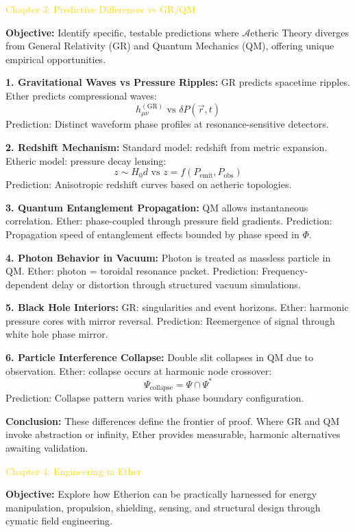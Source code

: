 \textcolor{gold}{ Chapter 3: Predictive Differences vs GR/QM }

\textbf{Objective:}
Identify specific, testable predictions where $\mathcal{A}$etheric Theory diverges from General Relativity (GR) and Quantum Mechanics (QM), offering unique empirical opportunities.

\textbf{1. Gravitational Waves vs Pressure Ripples:}
GR predicts spacetime ripples. Ether predicts compressional waves:
\[
h_{\mu \nu}^{(\mathrm{GR})} \text{ vs } \delta P(\vec{r}, t)
\]
Prediction: Distinct waveform phase profiles at resonance-sensitive detectors.

\textbf{2. Redshift Mechanism:}
Standard model: redshift from metric expansion. Etheric model: pressure decay lensing:
\[
z \sim H_0 d \text{ vs } z = f(P_{\text{emit}}, P_{\text{obs}})
\]
Prediction: Anisotropic redshift curves based on aetheric topologies.

\textbf{3. Quantum Entanglement Propagation:}
QM allows instantaneous correlation. Ether: phase-coupled through pressure field gradients. Prediction: Propagation speed of entanglement effects bounded by phase speed in $\Phi$.

\textbf{4. Photon Behavior in Vacuum:}
Photon is treated as massless particle in QM. Ether: photon = toroidal resonance packet. Prediction: Frequency-dependent delay or distortion through structured vacuum simulations.

\textbf{5. Black Hole Interiors:}
GR: singularities and event horizons. Ether: harmonic pressure cores with mirror reversal. Prediction: Reemergence of signal through white hole phase mirror.

\textbf{6. Particle Interference Collapse:}
Double slit collapses in QM due to observation. Ether: collapse occurs at harmonic node crossover:
\[
\Psi_{\text{collapse}} = \Psi \cap \Psi^*
\]
Prediction: Collapse pattern varies with phase boundary configuration.

\textbf{Conclusion:}
These differences define the frontier of proof. Where GR and QM invoke abstraction or infinity, Ether provides measurable, harmonic alternatives awaiting validation.

\textcolor{gold}{ Chapter 4: Engineering in Ether }

\textbf{Objective:}
Explore how Etherion can be practically harnessed for energy manipulation, propulsion, shielding, sensing, and structural design through cymatic field engineering.

